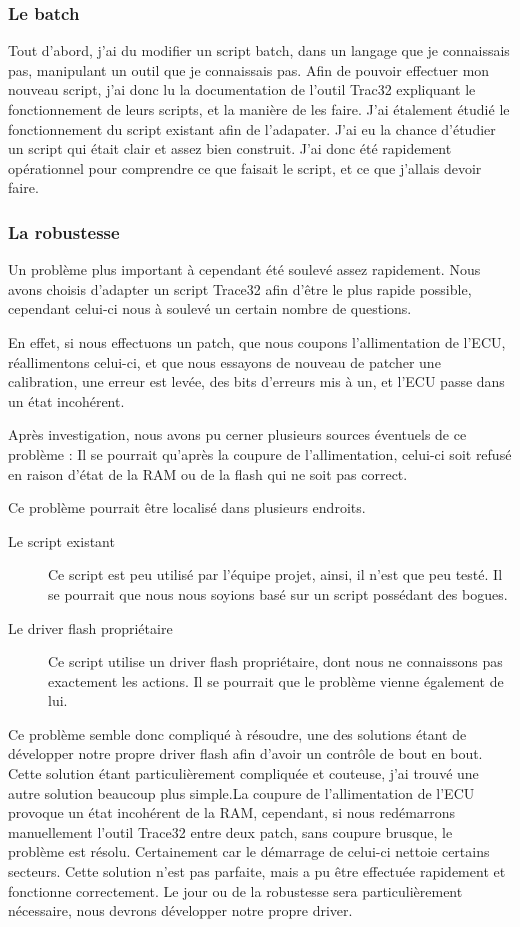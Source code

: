 	\subsubsection{Le batch}
	Tout d'abord, j'ai du modifier un script batch, dans un langage que je connaissais pas, manipulant un outil que je connaissais pas. Afin de pouvoir effectuer mon nouveau script, j'ai donc lu la documentation de l'outil Trac32 expliquant le fonctionnement de leurs scripts, et la manière de les faire. J'ai étalement étudié le fonctionnement du script existant afin de l'adapater. J'ai eu la chance d'étudier un script qui était clair et assez bien construit. J'ai donc été rapidement opérationnel pour comprendre ce que faisait le script, et ce que j'allais devoir faire.
	
	\subsubsection{La robustesse}
Un problème plus important à cependant été soulevé assez rapidement. Nous avons choisis d'adapter un script Trace32 afin d'être le plus rapide possible, cependant celui-ci nous à soulevé un certain nombre de questions.

En effet, si nous effectuons un patch, que nous coupons l'allimentation de l'ECU, réallimentons celui-ci, et que nous essayons de nouveau de patcher une calibration, une erreur est levée, des bits d'erreurs mis à un, et l'ECU passe dans un état incohérent. 

Après investigation, nous avons pu cerner plusieurs sources éventuels de ce problème : 
Il se pourrait qu'après la coupure de l'allimentation, celui-ci soit refusé en raison d'état de la RAM ou de la flash qui ne soit pas correct. 

Ce problème pourrait être localisé dans plusieurs endroits.
\begin{description}
\item[Le script existant] Ce script est peu utilisé par l'équipe projet, ainsi, il n'est que peu testé. Il se pourrait que nous nous soyions basé sur un script possédant des bogues.
\item[Le driver flash propriétaire] Ce script utilise un driver flash propriétaire, dont nous ne connaissons pas exactement les actions. Il se pourrait que le problème vienne également de lui.
\end{description}

Ce problème semble donc compliqué à résoudre, une des solutions étant de développer notre propre driver flash afin d'avoir un contrôle de bout en bout. Cette solution étant particulièrement compliquée et couteuse, j'ai trouvé une autre solution beaucoup plus simple.\newline La coupure de l'allimentation de l'ECU provoque un état incohérent de la RAM, cependant, si nous redémarrons manuellement l'outil Trace32 entre deux patch, sans coupure brusque, le problème est résolu. Certainement car le démarrage de celui-ci nettoie certains secteurs. Cette solution n'est pas parfaite, mais a pu être effectuée rapidement et fonctionne correctement. Le jour ou de la robustesse sera particulièrement nécessaire, nous devrons développer notre propre driver.


